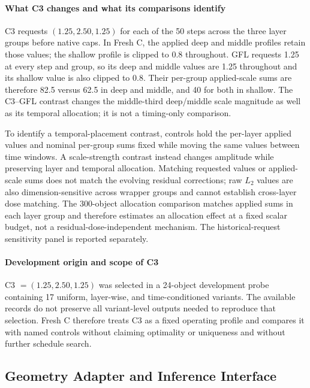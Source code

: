 \documentclass[times,twocolumn,final]{elsarticle}
\begin{document}
\paragraph{What C3 changes and what its comparisons identify}
C3 requests $(1.25,2.50,1.25)$ for each of the 50 steps across the three layer groups before native caps. In Fresh C, the applied deep and middle profiles retain those values; the shallow profile is clipped to 0.8 throughout. GFL requests 1.25 at every step and group, so its deep and middle values are 1.25 throughout and its shallow value is also clipped to 0.8. Their per-group applied-scale sums are therefore 82.5 versus 62.5 in deep and middle, and 40 for both in shallow. The C3--GFL contrast changes the middle-third deep/middle scale magnitude as well as its temporal allocation; it is not a timing-only comparison.

To identify a temporal-placement contrast, controls hold the per-layer applied values and nominal per-group sums fixed while moving the same values between time windows. A scale-strength contrast instead changes amplitude while preserving layer and temporal allocation. Matching requested values or applied-scale sums does not match the evolving residual corrections; raw $L_2$ values are also dimension-sensitive across wrapper groups and cannot establish cross-layer dose matching. The 300-object allocation comparison matches applied sums in each layer group and therefore estimates an allocation effect at a fixed scalar budget, not a residual-dose-independent mechanism. The historical-request sensitivity panel is reported separately.

\paragraph{Development origin and scope of C3}
C3 $=(1.25,2.50,1.25)$ was selected in a 24-object development probe containing 17 uniform, layer-wise, and time-conditioned variants. The available records do not preserve all variant-level outputs needed to reproduce that selection. Fresh C therefore treats C3 as a fixed operating profile and compares it with named controls without claiming optimality or uniqueness and without further schedule search.

\subsection{Geometry Adapter and Inference Interface}
\label{subsec:adapterimpl}
\end{document}
